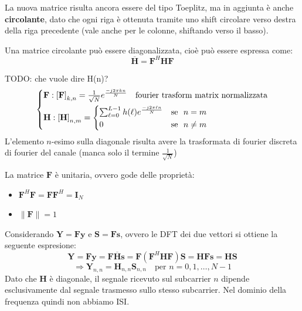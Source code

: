 La nuova matrice risulta ancora essere del tipo Toeplitz, ma in aggiunta è anche \textbf{circolante}, dato che ogni riga è ottenuta tramite uno shift circolare verso destra della riga precedente (vale anche per le colonne, shiftando verso il basso).

Una matrice circolante può essere diagonalizzata, cioè può essere espressa come:
\[
    \overline{\mathbf{H}} = \mathbf{F}^H \mathbf{H} \mathbf{F}
\]




TODO: che vuole dire H(n)?
\[
    \begin{cases*}
        \mathbf{F}: \left[\mathbf{F}\right]_{k, n} = \frac{1}{\sqrt{N}} e^{\frac{-j2\pi kn}{N}} \quad \text{fourier trasform matrix normalizzata} \\
        \mathbf{H}: \left[\mathbf{H}\right]_{n, m} = \begin{cases*}
                                                        \sum_{\ell=0}^{L-1} h(\ell) e^{\frac{-j2\pi \ell n}{N}} & \text{se } $n = m$ \\
                                                        0 & \text{se } $n \neq m$
                                                    \end{cases*}
    \end{cases*}
\]
L'elemento $n$-esimo sulla diagonale risulta avere la trasformata di fourier discreta di fourier del canale (manca solo il termine $\frac{1}{\sqrt{N}}$)


La matrice $\mathbf{F}$ è unitaria, ovvero gode delle proprietà:
\begin{itemize}
    \item $\mathbf{F}^H \mathbf{F} = \mathbf{F} \mathbf{F}^H = \mathbf{I}_N$
    \item $\| \mathbf{F} \| = 1$ 
\end{itemize}

Considerando $\mathbf{Y} = \mathbf{F} \mathbf{y}$ e $\mathbf{S} = \mathbf{F} \mathbf{s}$, ovvero le DFT dei due vettori si ottiene la seguente espresione:
\[
    \mathbf{Y} = \mathbf{F} \mathbf{y} = \mathbf{F} \mathbf{\overline{H}} \mathbf{s} = \mathbf{F} \left(\mathbf{F}^H \mathbf{H} \mathbf{F}\right)\mathbf{S} =  \mathbf{H} \mathbf{F} \mathbf{s} = \mathbf{H} \mathbf{S}
\]
\[
    \Rightarrow \mathbf{Y}_{n,n} = \mathbf{H}_{n,n} \mathbf{S}_{n,n} \quad \text{per } n = 0, 1, \ldots, N-1
\]
Dato che $\mathbf{H}$ è diagonale, il segnale ricevuto sul subcarrier $n$ dipende esclusivamente dal segnale trasmesso sullo stesso subcarrier. Nel dominio della frequenza quindi non abbiamo ISI.


